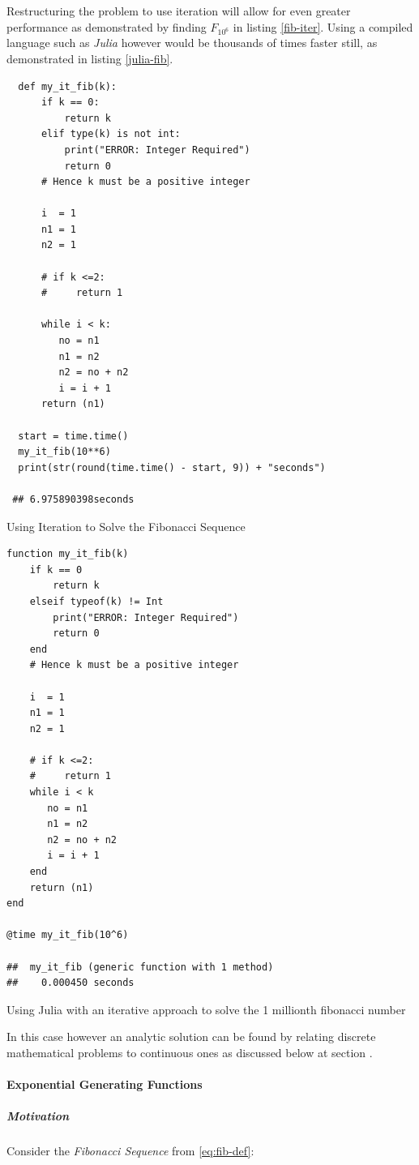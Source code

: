 \documentclass[11pt]{article}
\begin{document}
Restructuring the problem to use iteration will allow for even greater performance as demonstrated by finding \(F_{10^{6}}\) in listing \ref{fib-iter}. Using a compiled language such as \emph{Julia} however would be thousands of times faster still, as demonstrated in listing \ref{julia-fib}.



\begin{listing}[htbp]
\begin{verbatim}
  def my_it_fib(k):
      if k == 0:
          return k
      elif type(k) is not int:
          print("ERROR: Integer Required")
          return 0
      # Hence k must be a positive integer

      i  = 1
      n1 = 1
      n2 = 1

      # if k <=2:
      #     return 1

      while i < k:
         no = n1
         n1 = n2
         n2 = no + n2
         i = i + 1
      return (n1)

  start = time.time()
  my_it_fib(10**6)
  print(str(round(time.time() - start, 9)) + "seconds")

 ## 6.975890398seconds
\end{verbatim}
\caption{\label{fib-iter}Using Iteration to Solve the Fibonacci Sequence}
\end{listing}

\begin{listing}[htbp]
\begin{verbatim}
function my_it_fib(k)
    if k == 0
        return k
    elseif typeof(k) != Int
        print("ERROR: Integer Required")
        return 0
    end
    # Hence k must be a positive integer

    i  = 1
    n1 = 1
    n2 = 1

    # if k <=2:
    #     return 1
    while i < k
       no = n1
       n1 = n2
       n2 = no + n2
       i = i + 1
    end
    return (n1)
end

@time my_it_fib(10^6)

##  my_it_fib (generic function with 1 method)
##    0.000450 seconds
\end{verbatim}
\caption{\label{julia-fib}Using Julia with an iterative approach to solve the 1 millionth fibonacci number}
\end{listing}

In this case however an analytic solution can be found by relating discrete
mathematical problems to continuous ones as discussed below at section .
\paragraph{Exponential Generating Functions}
\label{exp-gen-func-fib-seq}
\subparagraph{Motivation}
\label{motivation}
Consider the \emph{Fibonacci Sequence} from \eqref{eq:fib-def}:
\end{document}
